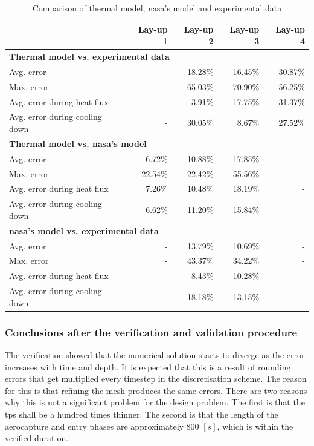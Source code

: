 \begin{table}[h]
	\centering
	\caption{Comparison of thermal model, \acrshort{nasa}'s model and experimental data}
	\begin{tabular}{|p{5.6cm}|rrrr|}
		\hline
		\textbf{} & \textbf{Lay-up 1} & \textbf{Lay-up 2} & \textbf{Lay-up 3} & \textbf{Lay-up 4} \\ \hline \hline
		\multicolumn{5}{|l|}{\textbf{Thermal model vs. experimental data}}			\\ \hline	
		Avg. error											&        - & 18.28\% & 16.45\% & 30.87\% \\
		Max. error											&        - & 65.03\% & 70.90\% & 56.25\% \\
		Avg. error during heat flux							&        - &  3.91\% & 17.75\% & 31.37\% \\
		Avg. error during cooling down						&        - & 30.05\% &  8.67\% & 27.52\% \\ \hline
		\multicolumn{5}{|l|}{\textbf{Thermal model vs. \gls{nasa}'s model}}			\\ \hline		
		Avg. error											&   6.72\% & 10.88\% & 17.85\% &        - \\
		Max. error											&  22.54\% & 22.42\% & 55.56\% &        - \\
		Avg. error during heat flux							&   7.26\% & 10.48\% & 18.19\% &        - \\
		Avg. error during cooling down						&   6.62\% & 11.20\% & 15.84\% &        - \\ \hline
		\multicolumn{5}{|l|}{\textbf{\gls{nasa}'s model vs. experimental data}}			\\ \hline		
		Avg. error											&        - & 13.79\% & 10.69\% &        - \\
		Max. error											&        - & 43.37\% & 34.22\% &        - \\
		Avg. error during heat flux							&        - &  8.43\% & 10.28\% &        - \\
		Avg. error during cooling down						&        - & 18.18\% & 13.15\% &        - \\ \hline
	\end{tabular}
	\label{tab:valerrorthermo}
\end{table}


\subsubsection{Conclusions after the verification and validation procedure}
The verification showed that the numerical solution starts to diverge as the error increases with time and depth. It is expected that this is a result of rounding errors that get multiplied every timestep in the discretisation scheme. The reason for this is that refining the mesh produces the same errors. There are two reasons why this is not a significant problem for the design problem. The first is that the \gls{tps} shall be a hundred times thinner. The second is that the length of the aerocapture and entry phases are approximately 800 $\left[s\right]$, which is within the verified duration. 
 
